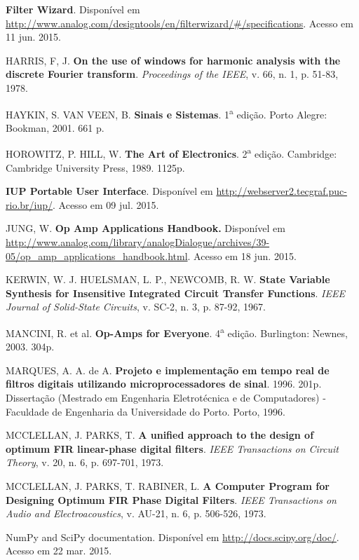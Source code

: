 \begin{thebibliography}{99}
 \textbf{Filter Wizard}. Disponível em \url{http://www.analog.com/designtools/en/filterwizard/#/specifications}. Acesso em 11 jun. 2015.

 HARRIS, F, J. \textbf{On the use of windows for harmonic analysis with the discrete Fourier transform}. \textit{Proceedings of the IEEE}, v. 66, n. 1, p. 51-83, 1978.

 HAYKIN, S. VAN VEEN, B. \textbf{Sinais e Sistemas}. 1\textsuperscript{a} edição. Porto Alegre: Bookman, 2001. 661 p.

 HOROWITZ, P. HILL, W. \textbf{The Art of Electronics}. 2\textsuperscript{a} edição. Cambridge: Cambridge University Press, 1989. 1125p.

 \textbf{IUP Portable User Interface}. Disponível em \url{http://webserver2.tecgraf.puc-rio.br/iup/}. Acesso em 09 jul. 2015.

 JUNG, W. \textbf{Op Amp Applications Handbook.} Disponível em \url{http://www.analog.com/library/analogDialogue/archives/39-05/op_amp_applications_handbook.html}. Acesso em 18 jun. 2015.

 KERWIN, W. J. HUELSMAN, L. P., NEWCOMB, R. W. \textbf{State Variable Synthesis for Insensitive Integrated Circuit Transfer Functions}. \textit{IEEE Journal of Solid-State Circuits}, v. SC-2, n. 3, p. 87-92, 1967.

 MANCINI, R. et al. \textbf{Op-Amps for Everyone}. 4\textsuperscript{a}  edição. Burlington: Newnes, 2003. 304p.

 MARQUES, A. A. de A. \textbf{Projeto e implementação em tempo real de filtros digitais utilizando microprocessadores de sinal}. 1996. 201p. Dissertação (Mestrado em Engenharia Eletrotécnica e de Computadores) - Faculdade de Engenharia da Universidade do Porto. Porto, 1996. %

 MCCLELLAN, J. PARKS, T. \textbf{A unified approach to the design of optimum FIR linear-phase digital filters}. \textit{IEEE Transactions on Circuit Theory}, v. 20, n. 6, p. 697-701, 1973.

 MCCLELLAN, J. PARKS, T. RABINER, L. \textbf{A Computer Program for Designing Optimum FIR Phase Digital Filters}. \textit{IEEE Transactions on Audio and Electroacoustics}, v. AU-21, n. 6, p. 506-526, 1973.

 NumPy and SciPy documentation. Disponível em \url{http://docs.scipy.org/doc/}. Acesso em 22 mar. 2015.


\end{thebibliography}
